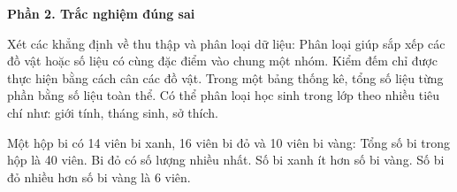 \textbf{Phần 2. Trắc nghiệm đúng sai}

\begin{ex} %
Xét các khẳng định về thu thập và phân loại dữ liệu:
\choiceTF
{\True Phân loại giúp sắp xếp các đồ vật hoặc số liệu có cùng đặc điểm vào chung một nhóm.}
{Kiểm đếm chỉ được thực hiện bằng cách cân các đồ vật.}
{\True Trong một bảng thống kê, tổng số liệu từng phần bằng số liệu toàn thể.}
{\True Có thể phân loại học sinh trong lớp theo nhiều tiêu chí như: giới tính, tháng sinh, sở thích.}
\end{ex}

\begin{ex} %
Một hộp bi có 14 viên bi xanh, 16 viên bi đỏ và 10 viên bi vàng:
\choiceTF
{\True Tổng số bi trong hộp là 40 viên.}
{\True Bi đỏ có số lượng nhiều nhất.}
{Số bi xanh ít hơn số bi vàng.}
{\True Số bi đỏ nhiều hơn số bi vàng là 6 viên.}
\end{ex}

